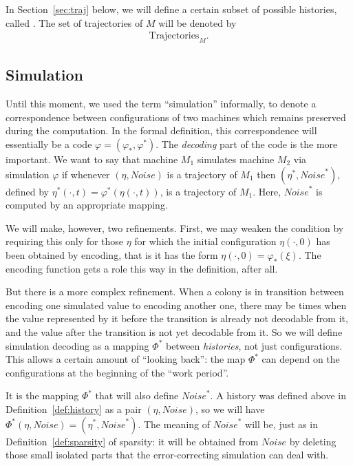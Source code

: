 \documentclass[11pt]{memoir}
\theoremstyle{definition} %
\newcommand{\Noise}{\mathit{Noise}}
\newcommand{\Trajectories}{\mathrm{Trajectories}}
\begin{document}
In Section~\ref{sec:traj} below, we will define a certain subset of possible histories, called .
The set of trajectories of \( M \) will be denoted by
\begin{align*}
   \Trajectories_{M}.
 \end{align*}

\subsection{Simulation}\label{sec:sim}

Until this moment, we used the term ``simulation'' informally, to denote
a correspondence between configurations of
two machines which remains preserved during the computation.
In the formal definition, this correspondence will essentially be a code
\( \varphi=(\varphi_{*},\varphi^{*}) \).
The \emph{decoding} part of the code is the more important.
We want to say that machine \( M_{1} \) simulates machine \( M_{2} \) via
simulation \( \varphi \) if whenever \( (\eta, \Noise) \) is a trajectory of \( M_{1} \) 
then \( (\eta^{*},\Noise^{*}) \),
defined by \( \eta^{*}(\cdot,t)=\varphi^{*}(\eta(\cdot,t)) \), is a
trajectory of \( M_{1} \).
Here, \( \Noise^{*} \) is computed by an appropriate mapping.

We will make, however, two refinements.
First, we may weaken the condition by requiring this only for
those \( \eta \) for which the initial configuration
 \( \eta(\cdot,0) \) has been obtained by encoding, that is it has the form 
\( \eta(\cdot,0)=\varphi_{*}(\xi) \).
The encoding function gets a role this way in the definition, after all.

But there is a more complex refinement.
When a colony is in transition between encoding one simulated value to encoding another one,
there may be times when the value represented by it before the transition
is already not decodable from it, and the value after the transition is not yet decodable from it.
So we will define simulation decoding as a mapping \( \Phi^{*} \)
between \emph{histories}, not just configurations.
This allows a certain amount of ``looking back'':
the map \( \Phi^{*} \) can depend on the configurations at the beginning of the ``work period''.

It is the mapping \( \Phi^{*} \) that will also define \( \Noise^{*} \).
A history was defined above in Definition~\ref{def:history} 
as a pair \( (\eta,\Noise) \), so we will have
\( \Phi^{*}(\eta,\Noise)=(\eta^{*},\Noise^{*}) \).
The meaning of \( \Noise^{*} \) will be, just as in Definition~\ref{def:sparsity} of sparsity:
it will be obtained from \( \Noise \) by deleting those small isolated parts that the 
error-correcting simulation can deal with.
\end{document}
